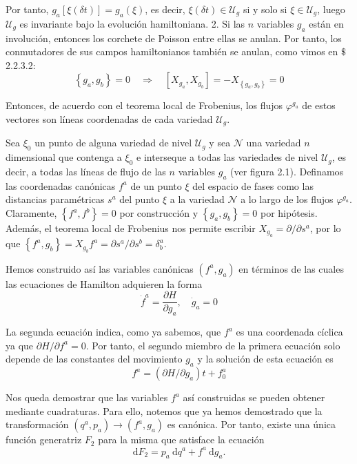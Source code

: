 Por tanto, $g_{a}[\xi(\delta t)]=g_{a}(\xi)$, es decir, $\xi(\delta t) \in \mathscr{U}_{g}$ si y solo si $\xi \in \mathscr{U}_{g}$, luego $\mathscr{U}_{g}$ es invariante bajo la evolución hamiltoniana.
2. Si las $n$ variables $g_{a}$ están en involución, entonces los corchete de Poisson entre ellas se anulan. Por tanto, los conmutadores de sus campos hamiltonianos también se anulan, como vimos en $\mathbb{\$}$ 2.2.3.2:
$$
\left\{g_{a}, g_{b}\right\}=0 \quad \Rightarrow \quad\left[X_{g_{a}}, X_{g_{b}}\right]=-X_{\left\{g_{a}, g_{b}\right\}}=0
$$

Entonces, de acuerdo con el teorema local de Frobenius, los flujos $\varphi^{g_{a}}$ de estos vectores son líneas coordenadas de cada variedad $\mathscr{U}_{g}$.

Sea $\xi_{0}$ un punto de alguna variedad de nivel $\mathscr{U}_{g}$ y sea $\mathscr{N}$ una variedad $n$ dimensional que contenga a $\xi_{0}$ e interseque a todas las variedades de nivel $\mathscr{U}_{g}$,
es decir, a todas las líneas de flujo de las $n$ variables $g_{a}$ (ver figura 2.1). Definamos las coordenadas canónicas $f^{a}$ de un punto $\xi$ del espacio de fases como las distancias paramétricas $s^{a}$ del punto $\xi$ a la variedad $\mathscr{N}$ a lo largo de los flujos $\varphi^{g_{a}}$. Claramente, $\left\{f^{a}, f^{b}\right\}=0$ por construcción y $\left\{g_{a}, g_{b}\right\}=0$ por hipótesis. Además, el teorema local de Frobenius nos permite escribir $X_{g_{a}}=\partial / \partial s^{a}$, por lo que $\left\{f^{a}, g_{b}\right\}=X_{g_{b}} f^{a}=\partial s^{a} / \partial s^{b}=\delta_{b}^{a}$.

Hemos construido así las variables canónicas $\left(f^{a}, g_{a}\right)$ en términos de las cuales las ecuaciones de Hamilton adquieren la forma
$$
\dot{f}^{a}=\frac{\partial H}{\partial g_{a}}, \quad \dot{g}_{a}=0
$$

La segunda ecuación indica, como ya sabemos, que $f^{a}$ es una coordenada cíclica ya que $\partial H / \partial f^{a}=0$. Por tanto, el segundo miembro de la primera ecuación solo depende de las constantes del movimiento $g_{a}$ y la solución de esta ecuación es
$$
\begin{equation*}
f^{a}=\left(\partial H / \partial g_{a}\right) t+f_{0}^{a} \tag{3.2}
\end{equation*}
$$

Nos queda demostrar que las variables $f^{a}$ así construidas se pueden obtener mediante cuadraturas. Para ello, notemos que ya hemos demostrado que la transformación $\left(q^{a}, p_{a}\right) \rightarrow\left(f^{a}, g_{a}\right)$ es canónica. Por tanto, existe una única función generatriz $F_{2}$ para la misma que satisface la ecuación
$$
\begin{equation*}
\mathrm{d} F_{2}=p_{a} \mathrm{~d} q^{a}+f^{a} \mathrm{~d} g_{a} . \tag{3.3}
\end{equation*}
$$

